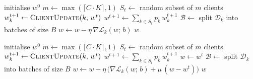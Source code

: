 \documentclass[11pt,a4paper]{article}
\begin{document}
\begin{algorithm}[H]
\caption{\textsc{FedAvg} \citep{mcmahan2017fedavg}. $K$ clients indexed
by $k$; $C$ client-sampling fraction; $E$ local epochs; $\eta$ local
learning rate; $B$ local mini-batch size.}
\label{alg:fedavg}
\begin{algorithmic}[1]
  \State initialise $w^0$
    \State $m \gets \max(\lceil C \cdot K\rceil, 1)$
    \State $S_t \gets$ random subset of $m$ clients
      \State $w_k^{t+1} \gets \textsc{ClientUpdate}(k,\, w^t)$
    \EndFor
    \State $w^{t+1} \gets \sum_{k \in S_t} p_k\, w_k^{t+1}$
  \EndFor
\EndProcedure
\Statex
{}
  \State $\mathcal{B} \gets$ split $\mathcal{D}_k$ into batches of size $B$
      \State $w \gets w - \eta\, \nabla \mathcal{L}_k(w;\, b)$
    \EndFor
  \EndFor
  \State \Return $w$
\EndProcedure
\end{algorithmic}
\end{algorithm}

\begin{algorithm}[H]
\caption{\textsc{FedProx} \citep{li2020fedprox}. Identical to
\textsc{FedAvg} except for the local objective, which adds a proximal
anchor of strength $\mu \ge 0$ to the global iterate $w^t$.}
\label{alg:fedprox}
\begin{algorithmic}[1]
  \State initialise $w^0$
    \State $m \gets \max(\lceil C \cdot K\rceil, 1)$
    \State $S_t \gets$ random subset of $m$ clients
      \State $w_k^{t+1} \gets \textsc{ClientUpdate}(k,\, w^t)$
    \EndFor
    \State $w^{t+1} \gets \sum_{k \in S_t} p_k\, w_k^{t+1}$
  \EndFor
\EndProcedure
\Statex
{}
  \State $w \gets w^t$
  \State $\mathcal{B} \gets$ split $\mathcal{D}_k$ into batches of size $B$
      \State $w \gets w - \eta\, \bigl(\nabla \mathcal{L}_k(w;\, b)
        + \mu\,(w - w^t)\bigr)$
    \EndFor
  \EndFor
  \State \Return $w$
\EndProcedure
\end{algorithmic}
\end{algorithm}
\end{document}
